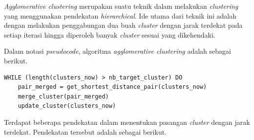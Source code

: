 \documentclass[11pt]{article}
\begin{document}
\emph{Agglomerative clustering} merupakan suatu teknik dalam melakukan
\emph{clustering} yang menggunakan pendekatan \emph{hierarchical}. Ide
utama dari teknik ini adalah dengan melakukan penggabungan dua buah
\emph{cluster} dengan jarak terdekat pada setiap iterasi hingga
diperoleh banyak \emph{cluster} sesuai yang dikehendaki.

Dalam notasi \emph{pseudocode}, algoritma \emph{agglomerative
clustering} adalah sebagai berikut.

\begin{verbatim}
WHILE (length(clusters_now) > nb_target_cluster) DO
    pair_merged = get_shortest_distance_pair(clusters_now)
    merge_cluster(pair_merged)
    update_cluster(clusters_now)
\end{verbatim}

Terdapat beberapa pendekatan dalam menentukan pasangan \emph{cluster}
dengan jarak terdekat. Pendekatan tersebut adalah sebagai berikut.
\end{document}

